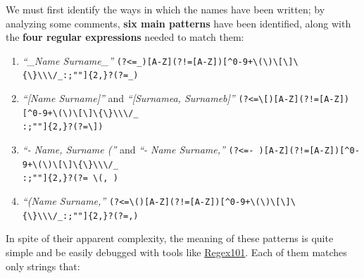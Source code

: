 \documentclass[11pt]{article}
\begin{document}
We must first identify the ways in which the names have been written; by
analyzing some comments, \textbf{six main patterns} have been
identified, along with the \textbf{four regular expressions} needed to
match them:

\begin{enumerate}

\item \emph{``\_Name Surname\_''}
\texttt{(?\textless{}=\_){[}A-Z{]}(?!={[}A-Z{]}){[}\^{}0-9+\textbackslash{}(\textbackslash{})\textbackslash{}{[}\textbackslash{}{]}\textbackslash{}\{\textbackslash{}\}\textbackslash{}\textbackslash{}\textbackslash{}/\_:;""{]}\{2,\}?(?=\_)}
\item \emph{``{[}Name Surname{]}''} and \emph{``{[}Surnamea, Surnameb{]}''}
\texttt{(?\textless{}=\textbackslash{}{[}){[}A-Z{]}(?!={[}A-Z{]}){[}\^{}0-9+\textbackslash{}(\textbackslash{})\textbackslash{}{[}\textbackslash{}{]}\textbackslash{}\{\textbackslash{}\}\textbackslash{}\textbackslash{}\textbackslash{}/\_ \\ :;""{]}\{2,\}?(?=\textbackslash{}{]})}
\item \emph{``- Name, Surname (''} and \emph{``- Name Surname,''}
\texttt{(?\textless{}=-\ ){[}A-Z{]}(?!={[}A-Z{]}){[}\^{}0-9+\textbackslash{}(\textbackslash{})\textbackslash{}{[}\textbackslash{}{]}\textbackslash{}\{\textbackslash{}\}\textbackslash{}\textbackslash{}\textbackslash{}/\_ \\ :;""{]}\{2,\}?(?=\ \textbackslash{}(\textbar{},\ )}
\item \emph{``(Name Surname,''}
\texttt{(?\textless{}=\textbackslash{}(){[}A-Z{]}(?!={[}A-Z{]}){[}\^{}0-9+\textbackslash{}(\textbackslash{})\textbackslash{}{[}\textbackslash{}{]}\textbackslash{}\{\textbackslash{}\}\textbackslash{}\textbackslash{}\textbackslash{}/\_:;""{]}\{2,\}?(?=,)}

\end{enumerate}

In spite of their apparent complexity, the meaning of these patterns is
quite simple and be easily debugged with tools like
\href{https://regex101.com/}{Regex101}. Each of them matches only
strings that:
\end{document}
